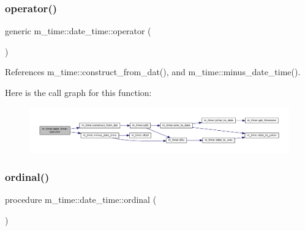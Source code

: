 \subsubsection{\texorpdfstring{operator()}{operator()}\hspace{0.1cm}{\footnotesize\ttfamily [9/9]}}
{\footnotesize\ttfamily generic m\+\_\+time\+::date\+\_\+time\+::operator (\begin{DoxyParamCaption}{ }\end{DoxyParamCaption})\hspace{0.3cm}{\ttfamily [private]}}



References m\+\_\+time\+::construct\+\_\+from\+\_\+dat(), and m\+\_\+time\+::minus\+\_\+date\+\_\+time().

Here is the call graph for this function\+:\nopagebreak
\begin{figure}[H]
\begin{center}
\leavevmode
\includegraphics[width=350pt]{structm__time_1_1date__time_adc11c2984fd9dae163e44627a5e2a134_cgraph}
\end{center}
\end{figure}
\mbox{\label{structm__time_1_1date__time_a0020bfaff4b78b7b0688dada7997d9f6}} 
\subsubsection{\texorpdfstring{ordinal()}{ordinal()}}
{\footnotesize\ttfamily procedure m\+\_\+time\+::date\+\_\+time\+::ordinal (\begin{DoxyParamCaption}{ }\end{DoxyParamCaption})\hspace{0.3cm}{\ttfamily [private]}}

\mbox{\label{structm__time_1_1date__time_a05e1950f16d81be0499b403b7e369b40}} 
